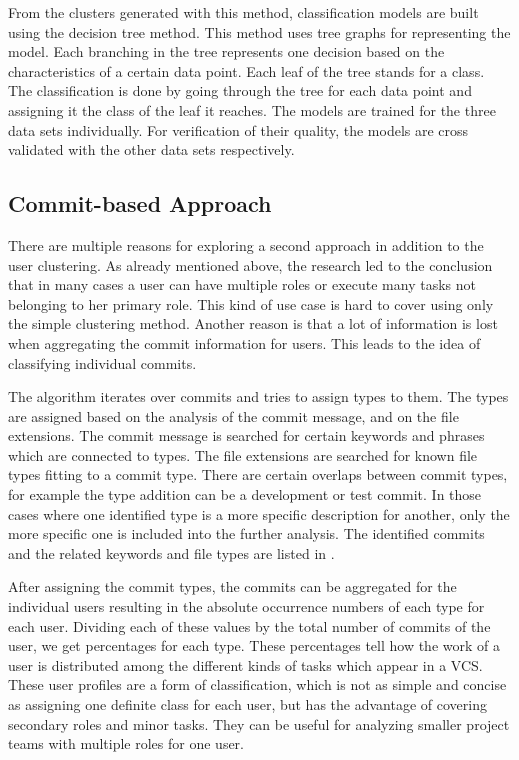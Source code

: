 From the clusters generated with this method, classification models are built using the decision tree method. This method uses tree graphs for representing the model. Each branching in the tree represents one decision based on the characteristics of a certain data point. Each leaf of the tree stands for a class. The classification is done by going through the tree for each data point and assigning it the class of the leaf it reaches. The models are trained for the three data sets individually. For verification of their quality, the models are cross validated with the other data sets respectively.


\subsection{Commit-based Approach}

There are multiple reasons for exploring a second approach in addition to the user clustering. As already mentioned above, the research led to the conclusion that in many cases a user can have multiple roles or execute many tasks not belonging to her primary role. This kind of use case is hard to cover using only the simple clustering method. Another reason is that a lot of information is lost when aggregating the commit information for users. This leads to the idea of classifying individual commits.


The algorithm iterates over commits and tries to assign types to them. The types are assigned based on the analysis of the commit message, and on the file extensions. The commit message is searched for certain keywords and phrases which are connected to types. The file extensions are searched for known file types fitting to a commit type. There are certain overlaps between commit types, for example the type addition can be a development or test commit. In those cases where one identified type is a more specific description for another, only the more specific one is included into the further analysis. The identified commits and the related keywords and file types are listed in .



After assigning the commit types, the commits can be aggregated for the individual users resulting in the absolute occurrence numbers of each type for each user. Dividing each of these values by the total number of commits of the user, we get percentages for each type. These percentages tell how the work of a user is distributed among the different kinds of tasks which appear in a VCS. These user profiles are a form of classification, which is not as simple and concise as assigning one definite class for each user, but has the advantage of covering secondary roles and minor tasks. They can be useful for analyzing smaller project teams with multiple roles for one user.

